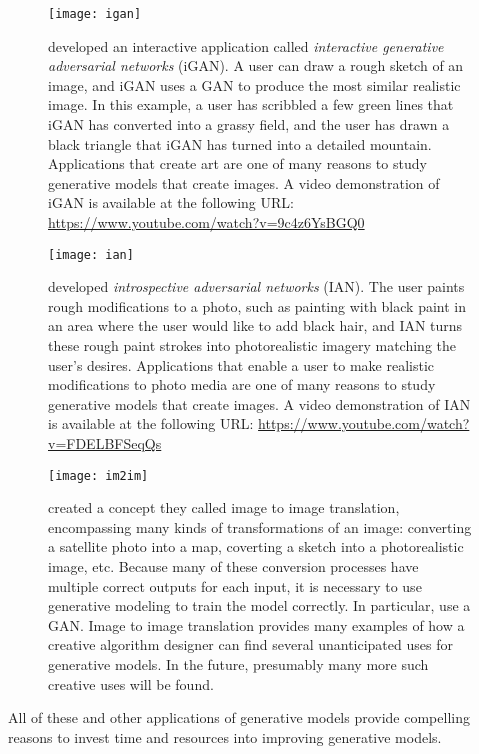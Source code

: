 \begin{figure}
  \centering
  \texttt{[image: igan]}
  \caption{
    \citet{zhu2016generative} developed an interactive application called {\em interactive generative adversarial networks}
(iGAN). 
A user can draw a rough sketch of an image, and iGAN uses a GAN to produce the most similar
realistic image.
In this example, a user has scribbled a few green lines that iGAN has converted into a grassy
field, and the user has drawn a black triangle that iGAN has turned into a detailed mountain.
Applications that create art are one of many reasons to study generative models that create
images.
A video demonstration of iGAN is available at the following URL:
\url{https://www.youtube.com/watch?v=9c4z6YsBGQ0}
}
  \label{fig:igan}
\end{figure}


\begin{figure}
  \centering
  \texttt{[image: ian]}
  \caption{
    \citet{BrockLRW16a} developed {\em introspective adversarial networks} (IAN).
    The user paints rough modifications to a photo, such as painting
    with black paint in an area where the user would like to add black
    hair, and IAN turns these rough paint strokes into photorealistic
    imagery matching the user's desires.
    Applications that enable a user to make realistic modifications to
    photo media are one of many reasons to study generative models
    that create images.
    A video demonstration of IAN is available at the following URL:
    \url{https://www.youtube.com/watch?v=FDELBFSeqQs}
  }
  \label{fig:ian}
\end{figure}

\begin{figure}
  \centering
  \texttt{[image: im2im]}
  \caption{
    \citet{isola2016image}
    created a concept they called {image to image translation},
    encompassing many kinds of transformations of an image:
    converting a satellite photo into a map,
    coverting a sketch into a photorealistic image,
    etc.
    Because many of these conversion processes have multiple
    correct outputs for each input, it is necessary to use
    generative modeling to train the model correctly.
    In particular, \citet{isola2016image} use a GAN.
    Image to image translation provides many examples of how
    a creative algorithm designer can find several unanticipated uses
    for generative models.
    In the future, presumably many more such creative uses
    will be found.
  }
  \label{fig:im2im}
\end{figure}

All of these and other applications of generative models provide compelling
reasons to invest time and resources into improving generative models.

